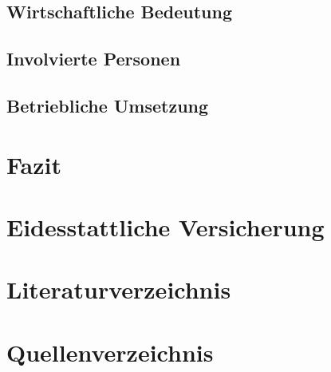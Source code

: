 \documentclass[10pt]{article}
\begin{document}
\subsection{Wirtschaftliche Bedeutung}
\subsection{Involvierte Personen}
\subsection{Betriebliche Umsetzung}
\section{Fazit}
\section{Eidesstattliche Versicherung}
\section{Literaturverzeichnis}
\section{Quellenverzeichnis}
\printbibliography
\end{document}
